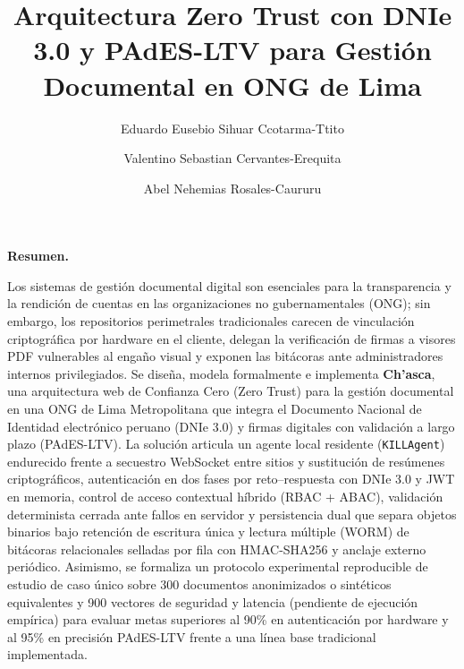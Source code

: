 \documentclass[runningheads,twocolumn]{llncs}
\renewcommand{\abstractname}{Resumen.}%
\renewenvironment{abstract}{%
  \par\addvspace{0.35\baselineskip}\small\noindent\textbf{\abstractname}\enspace\ignorespaces
}{\par\addvspace{0.45\baselineskip}}
\begin{document}
\title{Arquitectura Zero Trust con DNIe 3.0 y PAdES-LTV para Gestión Documental en ONG de Lima}


\author{Eduardo Eusebio Sihuar Ccotarma-Ttito \and
Valentino Sebastian Cervantes-Erequita \and
Abel Nehemias Rosales-Caururu}



\maketitle

\begin{abstract}
Los sistemas de gestión documental digital son esenciales para la transparencia y la rendición de cuentas en las organizaciones no gubernamentales (ONG); sin embargo, los repositorios perimetrales tradicionales carecen de vinculación criptográfica por hardware en el cliente, delegan la verificación de firmas a visores PDF vulnerables al engaño visual y exponen las bitácoras ante administradores internos privilegiados. Se diseña, modela formalmente e implementa \textbf{Ch'asca}, una arquitectura web de Confianza Cero (Zero Trust) para la gestión documental en una ONG de Lima Metropolitana que integra el Documento Nacional de Identidad electrónico peruano (DNIe 3.0) y firmas digitales con validación a largo plazo (PAdES-LTV). La solución articula un agente local residente (\texttt{KILLAgent}) endurecido frente a secuestro WebSocket entre sitios y sustitución de resúmenes criptográficos, autenticación en dos fases por reto--respuesta con DNIe 3.0 y JWT en memoria, control de acceso contextual híbrido (RBAC + ABAC), validación determinista cerrada ante fallos en servidor y persistencia dual que separa objetos binarios bajo retención de escritura única y lectura múltiple (WORM) de bitácoras relacionales selladas por fila con HMAC-SHA256 y anclaje externo periódico. Asimismo, se formaliza un protocolo experimental reproducible de estudio de caso único sobre 300 documentos anonimizados o sintéticos equivalentes y 900 vectores de seguridad y latencia (pendiente de ejecución empírica) para evaluar metas superiores al 90\% en autenticación por hardware y al 95\% en precisión PAdES-LTV frente a una línea base tradicional implementada.

\end{abstract}
\end{document}
